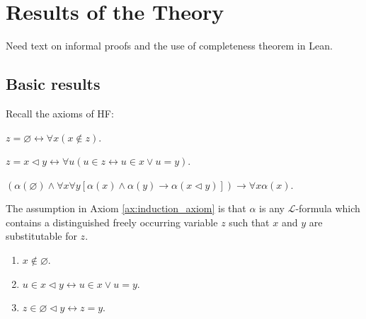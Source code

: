 \chapter{Results of the Theory}

Need text on informal proofs and the use of completeness theorem in Lean.

\section{Basic results}

Recall the axioms of HF:

\begin{axiom}
    \label{ax:empty_axiom}
    \leanok
    $z=\varnothing \leftrightarrow \forall x(x \notin z)$.
\end {axiom}

\begin{axiom}
    \label{ax:enlarge_axiom}
    \leanok
    $z=x \lhd y \leftrightarrow \forall u(u \in z \leftrightarrow u \in x \lor u=y)$.
\end {axiom}

\begin{axiom}
    \label{ax:induction_axiom}
    \leanok
    $(\alpha(\varnothing) \land \forall x \forall y[\alpha(x) \land \alpha(y) \rightarrow 
    \alpha(x \lhd y)]) \rightarrow \forall x \alpha(x)$. 
\end {axiom}

The assumption in Axiom \ref{ax:induction_axiom} is that 
$\alpha$ is any $\mathcal{L}$-formula which contains a 
distinguished freely occurring variable $z$ such that $x$ and $y$ are substitutable for $z$.

\begin{lemma}
    \label{lem:notin_empty+mem_enlarge+mem_enlarge_empty}
    \leanok
    \leavevmode
    \begin{enumerate}
        \item $x\notin \varnothing$.
        \item $u \in x \lhd y \leftrightarrow u \in x \lor u=y$.
        \item $z\in \varnothing \lhd y \leftrightarrow z = y$.
    \end{enumerate}
\end{lemma}


